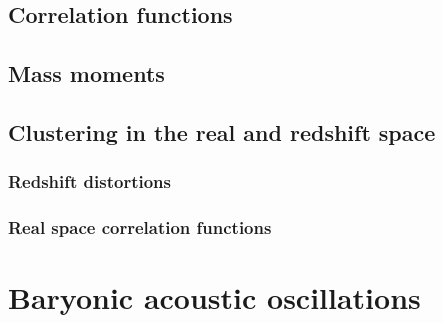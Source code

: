 \subsection{ Correlation functions }
\subsection{ Mass moments }
\subsection{ Clustering in the real and redshift space }
\subsubsection{ Redshift distortions }
\subsubsection{ Real space correlation functions }

\section{ Baryonic acoustic oscillations }
